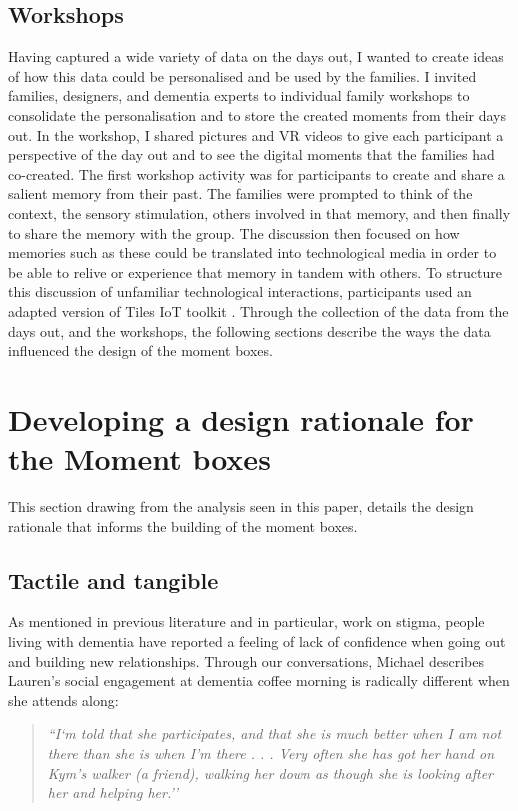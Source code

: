 \subsection{Workshops}
\label{workshops}
Having captured a wide variety of data on the days out, I wanted to create ideas of how this data could be personalised and be used by the families. I invited families, designers, and dementia experts to individual family workshops to consolidate the personalisation and to store the created moments from their days out. In the workshop, I shared pictures and VR videos to give each participant a perspective of the day out and to see the digital moments that the families had co-created. The first workshop activity was for participants to create and share a salient memory from their past. The families were prompted to think of the context, the sensory stimulation, others involved in that memory, and then finally to share the memory with the group. The discussion then focused on how memories such as these could be translated into technological media in order to be able to relive or experience that memory in tandem with others. To structure this discussion of unfamiliar technological interactions, participants used an adapted version of Tiles IoT toolkit \citep{mora2017tiles}. Through the collection of the data from the days out, and the workshops, the following sections describe the ways the data influenced the design of the moment boxes.


\section{Developing a design rationale for the Moment boxes}
\label{DesignRationale}
This section drawing from the analysis seen in this paper, details the design rationale that informs the building of the moment boxes. 

\subsection{Tactile and tangible}
\label{DR:TactileTangible}
As mentioned in previous literature and in particular, \cite{nolan_perceptions_2006} work on stigma, people living with dementia have reported a feeling of lack of confidence when going out and building new relationships. Through our conversations, Michael describes Lauren's social engagement at dementia coffee morning is radically different when she attends along:

\begin{quote}
\textit{    ``I`m told that she participates, and that she is much better when I am not there than she is when I’m there . . . Very often she has got her hand on Kym’s walker (a friend), walking her down as though she is looking after her and helping her.''
}
\end{quote}

